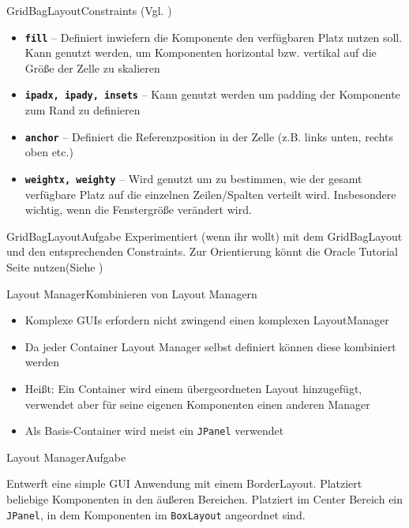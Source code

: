 \begin{frame}{GridBagLayout}{Constraints (Vgl. \cite{orac:gridbaglayout})}
    \begin{itemize}
        \item \textbf{\texttt{fill}} -- Definiert inwiefern die Komponente den verfügbaren Platz nutzen soll. Kann genutzt werden, um Komponenten horizontal bzw. vertikal auf die Größe der Zelle zu skalieren
        \item \textbf{\texttt{ipadx, ipady, insets}} -- Kann genutzt werden um padding der Komponente zum Rand zu definieren 
        \item \textbf{\texttt{anchor}} -- Definiert die Referenzposition in der Zelle (z.B. links unten, rechts oben etc.)
        \item \textbf{\texttt{weightx, weighty}} -- Wird genutzt um zu bestimmen, wie der gesamt verfügbare Platz auf die einzelnen Zeilen/Spalten verteilt wird. Insbesondere wichtig, wenn die Fenstergröße verändert wird.
    \end{itemize}
\end{frame}

\begin{frame}{GridBagLayout}{Aufgabe}
Experimentiert (wenn ihr wollt) mit dem GridBagLayout und den entsprechenden Constraints. Zur Orientierung könnt die Oracle Tutorial Seite nutzen(Siehe \cite{orac:gridbaglayout})
\end{frame}

\begin{frame}{Layout Manager}{Kombinieren von Layout Managern}
    \begin{itemize}
        \item Komplexe GUIs erfordern nicht zwingend einen komplexen LayoutManager
        \item Da jeder Container Layout Manager selbst definiert können diese kombiniert werden
        \item Heißt: Ein Container wird einem übergeordneten Layout hinzugefügt, verwendet aber für seine eigenen Komponenten einen anderen Manager
        \item Als Basis-Container wird meist ein \texttt{JPanel} verwendet
    \end{itemize}
\end{frame}

\begin{frame}{Layout Manager}{Aufgabe}
\begin{alertblock}{}
Entwerft eine simple GUI Anwendung mit einem BorderLayout. Platziert beliebige Komponenten in den äußeren Bereichen. Platziert im Center Bereich ein \texttt{JPanel}, in dem Komponenten im \texttt{BoxLayout} angeordnet sind.
\end{alertblock}
\end{frame}

